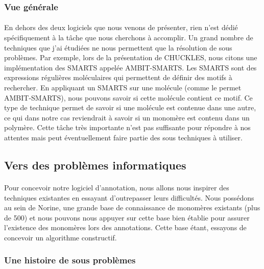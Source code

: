 \documentclass[12pt,french,twoside]{report}
\begin{document}
\subsubsection{Vue générale}

\paragraph{}En dehors des deux logiciels que nous venons de présenter, rien n'est dédié spécifiquement à la tâche que nous cherchons à accomplir.
Un grand nombre de techniques que j'ai étudiées ne nous permettent que la résolution de sous problèmes.
Par exemple, lors de la présentation de CHUCKLES, nous citons une implémentation des SMARTS appelée AMBIT-SMARTS.
Les SMARTS sont des expressions régulières moléculaires qui permettent de définir des motifs à rechercher.
En appliquant un SMARTS sur une molécule (comme le permet AMBIT-SMARTS), nous pouvons savoir si cette molécule contient ce motif.
Ce type de technique permet de savoir si une molécule est contenue dans une autre, ce qui dans notre cas reviendrait à savoir si un monomère est contenu dans un polymère.
Cette tâche très importante n'est pas suffisante pour répondre à nos attentes mais peut éventuellement faire partie des sous techniques à utiliser.




\subsection{Vers des problèmes informatiques}

\paragraph{}Pour concevoir notre logiciel d'annotation, nous allons nous inspirer des techniques existantes en essayant d'outrepasser leurs difficultés.
Nous possédons au sein de Norine, une grande base de connaissance de monomères existants (plus de 500) et nous pouvons nous appuyer sur cette base bien établie pour assurer l'existence des monomères lors des annotations.
Cette base étant, essayons de concevoir un algorithme constructif.


\subsubsection{Une histoire de sous problèmes}
\end{document}

